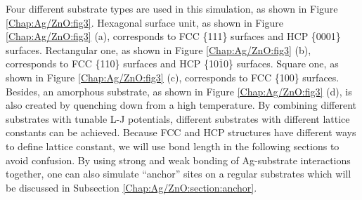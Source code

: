 Four different substrate types are used in this simulation, as shown in Figure \ref{Chap:Ag/ZnO:fig3}. Hexagonal surface unit, as shown in Figure \ref{Chap:Ag/ZnO:fig3} (a), corresponds to \ac{FCC} \{111\} surfaces and \ac{HCP} \{0001\} surfaces. Rectangular one, as shown in Figure \ref{Chap:Ag/ZnO:fig3} (b), corresponds to \ac{FCC} \{110\} surfaces and \ac{HCP} \{10$\overline{1}$0\} surfaces. Square one, as shown in Figure \ref{Chap:Ag/ZnO:fig3} (c), corresponds to \ac{FCC} \{100\} surfaces. Besides, an amorphous substrate, as shown in Figure \ref{Chap:Ag/ZnO:fig3} (d), is also created by quenching down from a high temperature. By combining different substrates with tunable \ac{L-J} potentials, different substrates with different lattice constants can be achieved. Because \ac{FCC} and \ac{HCP} structures have different ways to define lattice constant, we will use bond length in the following sections to avoid confusion. By using strong and weak bonding of Ag-substrate interactions together, one can also simulate ``anchor'' sites on a regular substrates which will be discussed in Subsection \ref{Chap:Ag/ZnO:section:anchor}.